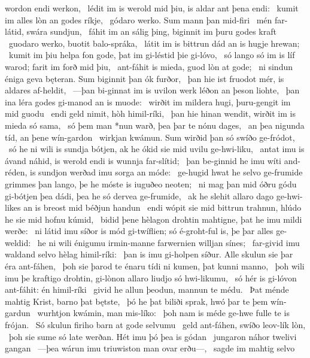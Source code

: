 wordon endi werkon, \hld\ lédit im is werold mid þiu,
is aldar ant þena endi: \hld\ kumit im alles lòn
an godes ríkje, \hld\ gódaro werko.
Sum mann þan mid-firi \hld\ mén far-látid,
swára sundjun, \hld\ fáhit im an sálig þing,
biginnit im þuru godes kraft \hld\ guodaro werko,
buotit balo-spráka, \hld\ látit im is bittrun dád
an is hugje hrewan; \hld\ kumit im þiu helpa fon gode,
þat im gi-léstid þie gi-lóvo, \hld\ só lango só im is líf warod;
farit im forð mid þiu, \hld\ ant-fáhit is mieda,
guod lòn at gode; \hld\ ni sindun éniga geva bęteran.
Sum biginnit þan ók furðor, \hld\ þan hie ist fruodot mér,
is aldares af-heldit, \hld\ —þan bi-ginnat im is uvilon werk
léðon an þeson liohte, \hld\ þan ina léra godes
gi-manod an is muode: \hld\ wirðit im mildera hugi,
þuru-gengit im mid guodu \hld\ endi geld nimit,
hòh himil-ríki, \hld\ þan hie hinan wendit,
wirðit im is mieda só sama, \hld\ só þem man *nun warð,
þea þar te nónu dages, \hld\ an þea nigunda tíd,
an þene wín-gardon \hld\ wirkjan kwámun.
Sum wirðid þan só swíðo ge-fródot, \hld\ só he ni wili is sundja bótjen,
ak he ókid sie mid uvilu ge-hwi-liku, \hld\ antat imu is ávand náhid,
is werold endi is wunnja far-slítid; \hld\ þan be-ginnid he imu wíti and-réden,
is sundjon werðad imu sorga an móde: \hld\ ge-hugid hwat he selvo ge-frumide
grimmes þan lango, þe he móste is iuguðeo neoten; \hld\ ni mag þan mid óðru gódu gi-bótjen
þea dádi, þea he só dervea ge-frumide, \hld\ ak he slehit allaro dago ge-hwi-likes
an is breost mid béðjun handun \hld\ endi wópit sie mid bittrun trahnun,
hlúdo he sie mid hofnu kúmid, \hld\ bidid þene hèlagon drohtin
mahtigne, þat he imu mildi werðe: \hld\ ni látid imu síðor is mód gi-twíflien;
só é-groht-ful is, þe þar alles ge-weldid: \hld\ he ni wili énigumu irmin-manne
farwernien willjan sínes; \hld\ far-givid imu waldand selvo
hèlag himil-ríki: \hld\ þan is imu gi-holpen síður.
Alle skulun sie þar éra ant-fáhen, \hld\ þoh sie þarod te énaru tídi
ni kumen, þat kunni manno, \hld\ þoh wili imu þe kraftigo drohtin,
gi-lònon allaro liudjo só hwi-likumu, \hld\ só hér is gi-lóvon ant-fáhit:
én himil-ríki \hld\ givid he allun þeodun,
mannun te médu. \hld\ Þat ménde mahtig Krist,
barno þat bętste, \hld\ þó he þat biliði sprak,
hwó þar te þem wín-gardun \hld\ wurhtjon kwámin,
man mis-líko: \hld\ þoh nam is méde ge-hwe
fulle te is frójan. \hld\ Só skulun firiho barn
at gode selvumu \hld\ geld ant-fáhen,
swíðo leov-lík lòn, \hld\ þoh sie sume só late werðan.
Hét imu þó þea is gódan \hld\ jungaron náhor
twelivi gangan \hld\ —þea wárun imu triuwiston
man ovar erðu—, \hld\ sagde im mahtig selvo
